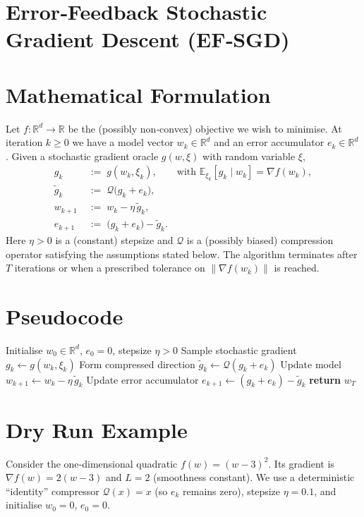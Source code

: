 \documentclass{article}
\newcommand{\E}{\mathbb{E}}
\newcommand{\R}{\mathbb{R}}
\newcommand{\norm}[1]{\left\lVert #1\right\rVert}
\newcommand{\Q}{\mathcal{Q}}
\begin{document}
\section*{Error‑Feedback Stochastic Gradient Descent (EF‑SGD)}

\section*{Mathematical Formulation}
Let $f:\R^{d}\rightarrow\R$ be the (possibly non‑convex) objective we wish to minimise.
At iteration $k\ge 0$ we have a model vector $w_k\in\R^{d}$ and an error accumulator
$e_k\in\R^{d}$.  
Given a stochastic gradient oracle $g(w,\xi)$ with random variable $\xi$,
\begin{align}
    g_k &\;:=\; g(w_k,\xi_k), \qquad\text{with }\E_{\xi_k}[g_k\mid w_k]=\nabla f(w_k), 
    \label{eq:sgd}\\[4pt]
    \tilde g_k &\;:=\; \Q\!\bigl(g_k+e_k\bigr),                                   \label{eq:quant}\\[4pt]
    w_{k+1} &\;:=\; w_k - \eta\,\tilde g_k,                                        \label{eq:update}\\[4pt]
    e_{k+1} &\;:=\; \bigl(g_k+e_k\bigr)-\tilde g_k .                               \label{eq:error}
\end{align}
Here $\eta>0$ is a (constant) stepsize and $\Q$ is a (possibly biased) compression
operator satisfying the assumptions stated below.  
The algorithm terminates after $T$ iterations or when a prescribed tolerance on
$\norm{\nabla f(w_k)}$ is reached.

\section*{Pseudocode}
\begin{algorithm}[H]
\caption{EF‑SGD}
\begin{algorithmic}[1]
\State Initialise $w_0\in\R^{d}$, $e_0=0$, stepsize $\eta>0$
    \State Sample stochastic gradient $g_k \gets g(w_k,\xi_k)$
    \State Form compressed direction $\tilde g_k \gets \Q(g_k+e_k)$
    \State Update model $w_{k+1} \gets w_k - \eta\,\tilde g_k$
    \State Update error accumulator $e_{k+1} \gets (g_k+e_k)-\tilde g_k$
\EndFor
\State \textbf{return} $w_T$
\end{algorithmic}
\end{algorithm}

\section*{Dry Run Example}
Consider the one‑dimensional quadratic $f(w)=(w-3)^2$.
Its gradient is $\nabla f(w)=2(w-3)$ and $L=2$ (smoothness constant).
We use a deterministic “identity” compressor $\Q(x)=x$ (so $e_k$ remains zero),
stepsize $\eta=0.1$, and initialise $w_0=0$, $e_0=0$.
\end{document}
